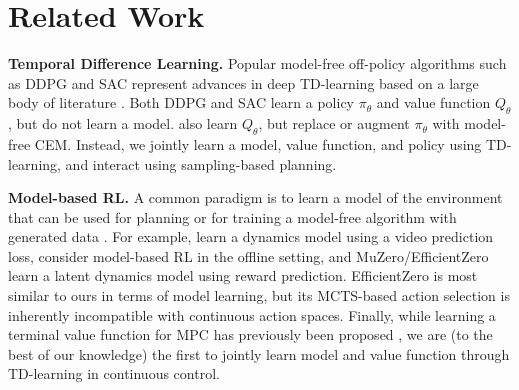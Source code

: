 \documentclass{article}
\begin{document}


\vspace{-0.025in}
\section{Related Work}
\label{sec:related-work}
\vspace{-0.05in}
\textbf{Temporal Difference Learning.} Popular model-free off-policy algorithms such as DDPG \citep{Lillicrap2016ContinuousCW} and SAC \citep{Haarnoja2018SoftAA} represent advances in deep TD-learning based on a large body of literature \citep{Sutton1988TD, mnih2013playing, Hasselt2016DeepRL, Mnih2016AsynchronousMF, Fujimoto2018AddressingFA, Kalashnikov2018QTOptSD, Espeholt2018IMPALASD, Pourchot2019CEMRLCE, Kalashnikov2021MTOptCM}. Both DDPG and SAC learn a policy $\pi_{\theta}$ and value function $Q_{\theta}$, but do not learn a model. \citet{Kalashnikov2018QTOptSD, shao2020grac, Kalashnikov2021MTOptCM} also learn $Q_{\theta}$, but replace or augment $\pi_{\theta}$ with model-free CEM. Instead, we jointly learn a model, value function, and policy using TD-learning, and interact using sampling-based planning.

\textbf{Model-based RL.} A common paradigm is to learn a model of the environment that can be used for planning \citep{Ebert2018VisualFM, Zhang2018SOLARDS, Janner2019WhenTT, hafner2019planet, Lowrey2019PlanOL, Kaiser2020ModelBasedRL, Bhardwaj2020InformationTM, Yu2020MOPOMO, Schrittwieser2020MasteringAG, Nguyen2021TemporalPC} or for training a model-free algorithm with generated data \citep{Pong2018TemporalDM, ha2018worldmodels, Hafner2020DreamTC, Sekar2020PlanningTE}. For example, \citet{Zhang2018SOLARDS, ha2018worldmodels, hafner2019planet, Hafner2020DreamTC} learn a dynamics model using a video prediction loss, \citet{Yu2020MOPOMO, Kidambi2020MOReLM} consider model-based RL in the offline setting, and MuZero/EfficientZero \citep{Schrittwieser2020MasteringAG,Ye2021MasteringAG} learn a latent dynamics model using reward prediction. EfficientZero is most similar to ours in terms of model learning, but its MCTS-based action selection is inherently incompatible with continuous action spaces. Finally, while learning a terminal value function for MPC has previously been proposed \citep{negenborn2005, Lowrey2019PlanOL, Bhardwaj2020InformationTM, Hatch2021TheVO}, we are (to the best of our knowledge) the first to jointly learn model and value function through TD-learning in continuous control.
\end{document}
